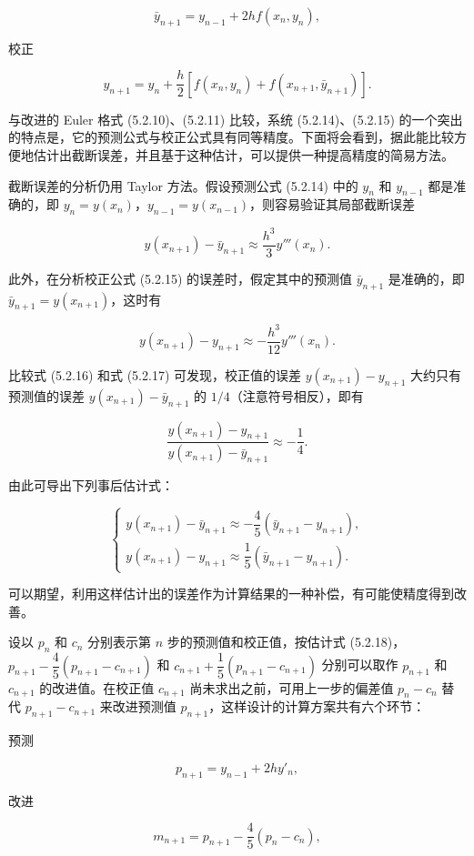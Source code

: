 \documentclass[
  10pt,
  fontset=fandol]{ctexart}
\begin{document}
\[
\bar y_{n+1}=y_{n-1}+2hf(x_n,y_n),\tag{5.2.14}
\]

校正

\[
y_{n+1}=y_n+\frac{h}{2}[f(x_n,y_n)+f(x_{n+1},\bar y_{n+1})].\tag{5.2.15}
\]

与改进的 Euler 格式 (5.2.10)、(5.2.11) 比较，系统 (5.2.14)、(5.2.15) 的一个突出的特点是，它的预测公式与校正公式具有同等精度。下面将会看到，据此能比较方便地估计出截断误差，并且基于这种估计，可以提供一种提高精度的简易方法。

截断误差的分析仍用 Taylor 方法。假设预测公式 (5.2.14) 中的 \(y_n\) 和 \(y_{n-1}\) 都是准确的，即 \(y_n=y(x_n)\)，\(y_{n-1}=y(x_{n-1})\)，则容易验证其局部截断误差

\[
y(x_{n+1})-\bar y_{n+1}\approx\frac{h^3}{3}y'''(x_n).\tag{5.2.16}
\]

此外，在分析校正公式 (5.2.15) 的误差时，假定其中的预测值 \(\bar y_{n+1}\) 是准确的，即 \(\bar y_{n+1}=y(x_{n+1})\)，这时有

\[
y(x_{n+1})-y_{n+1}\approx-\frac{h^3}{12}y'''(x_n).\tag{5.2.17}
\]

比较式 (5.2.16) 和式 (5.2.17) 可发现，校正值的误差 \(y(x_{n+1})-y_{n+1}\) 大约只有预测值的误差 \(y(x_{n+1})-\bar y_{n+1}\) 的 \(1/4\)（注意符号相反），即有

\[
\frac{y(x_{n+1})-y_{n+1}}{y(x_{n+1})-\bar y_{n+1}}\approx-\frac{1}{4}.
\]

由此可导出下列事后估计式：

\[
\begin{cases}
y(x_{n+1})-\bar y_{n+1}\approx-\dfrac{4}{5}(\bar y_{n+1}-y_{n+1}),\\
y(x_{n+1})-y_{n+1}\approx\dfrac{1}{5}(\bar y_{n+1}-y_{n+1}).
\end{cases}\tag{5.2.18}
\]

可以期望，利用这样估计出的误差作为计算结果的一种补偿，有可能使精度得到改善。

设以 \(p_n\) 和 \(c_n\) 分别表示第 \(n\) 步的预测值和校正值，按估计式 (5.2.18)，\(p_{n+1}-\dfrac{4}{5}(p_{n+1}-c_{n+1})\) 和 \(c_{n+1}+\dfrac{1}{5}(p_{n+1}-c_{n+1})\) 分别可以取作 \(p_{n+1}\) 和 \(c_{n+1}\) 的改进值。在校正值 \(c_{n+1}\) 尚未求出之前，可用上一步的偏差值 \(p_n-c_n\) 替代 \(p_{n+1}-c_{n+1}\) 来改进预测值 \(p_{n+1}\)，这样设计的计算方案共有六个环节：

预测

\[
p_{n+1}=y_{n-1}+2hy'_n,
\]

改进

\[
m_{n+1}=p_{n+1}-\frac{4}{5}(p_n-c_n),
\]
\end{document}
